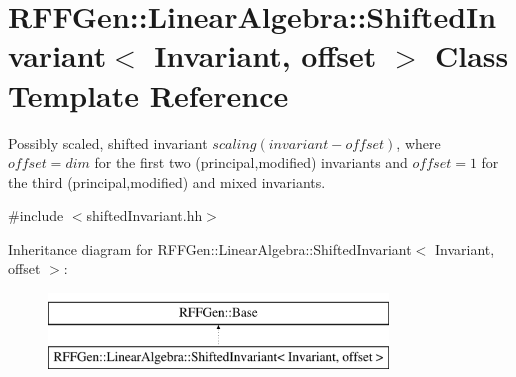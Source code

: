 \hypertarget{classRFFGen_1_1LinearAlgebra_1_1ShiftedInvariant}{\section{R\-F\-F\-Gen\-:\-:Linear\-Algebra\-:\-:Shifted\-Invariant$<$ Invariant, offset $>$ Class Template Reference}
\label{classRFFGen_1_1LinearAlgebra_1_1ShiftedInvariant}
}


Possibly scaled, shifted invariant $scaling (invariant - offset)$, where $offset = dim$ for the first two (principal,modified) invariants and $offset = 1$ for the third (principal,modified) and mixed invariants.  




{\ttfamily \#include $<$shifted\-Invariant.\-hh$>$}

Inheritance diagram for R\-F\-F\-Gen\-:\-:Linear\-Algebra\-:\-:Shifted\-Invariant$<$ Invariant, offset $>$\-:\begin{figure}[H]
\begin{center}
\leavevmode
\includegraphics[height=2.000000cm]{classRFFGen_1_1LinearAlgebra_1_1ShiftedInvariant}
\end{center}
\end{figure}

